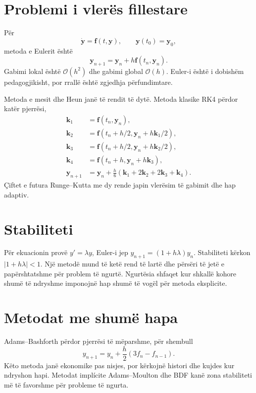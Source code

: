 \documentclass[11pt,oneside,openany]{book}
\newcommand{\vect}[1]{\bm{#1}}
\newcommand{\Oh}{\mathcal{O}}
\begin{document}
\section{Problemi i vlerës fillestare}
Për
\begin{equation}
 \dot{\vect y}=\vect f(t,\vect y),\qquad \vect y(t_0)=\vect y_0,
\end{equation}
metoda e Eulerit është
\begin{equation}
 \vect y_{n+1}=\vect y_n+h\vect f(t_n,\vect y_n).
\end{equation}
Gabimi lokal është $\Oh(h^2)$ dhe gabimi global $\Oh(h)$. Euler-i është i dobishëm pedagogjikisht, por rrallë është zgjedhja përfundimtare.

Metoda e mesit dhe Heun janë të rendit të dytë. Metoda klasike RK4 përdor katër pjerrësi,
\begin{align}
 \vect k_1&=\vect f(t_n,\vect y_n),\\
 \vect k_2&=\vect f(t_n+h/2,\vect y_n+h\vect k_1/2),\\
 \vect k_3&=\vect f(t_n+h/2,\vect y_n+h\vect k_2/2),\\
 \vect k_4&=\vect f(t_n+h,\vect y_n+h\vect k_3),\\
 \vect y_{n+1}&=\vect y_n+\frac h6(\vect k_1+2\vect k_2+2\vect k_3+\vect k_4).
\end{align}
Çiftet e futura Runge--Kutta me dy rende japin vlerësim të gabimit dhe hap adaptiv.

\section{Stabiliteti}
Për ekuacionin provë $y'=\lambda y$, Euler-i jep $y_{n+1}=(1+h\lambda)y_n$. Stabiliteti kërkon $|1+h\lambda|<1$. Një metodë mund të ketë rend të lartë dhe përsëri të jetë e papërshtatshme për problem të ngurtë. Ngurtësia shfaqet kur shkallë kohore shumë të ndryshme imponojnë hap shumë të vogël për metoda eksplicite.

\section{Metodat me shumë hapa}
Adams--Bashforth përdor pjerrësi të mëparshme, për shembull
\begin{equation}
 y_{n+1}=y_n+\frac h2(3f_n-f_{n-1}).
\end{equation}
Këto metoda janë ekonomike pas nisjes, por kërkojnë histori dhe kujdes kur ndryshon hapi. Metodat implícite Adams--Moulton dhe BDF kanë zona stabiliteti më të favorshme për probleme të ngurta.
\end{document}
